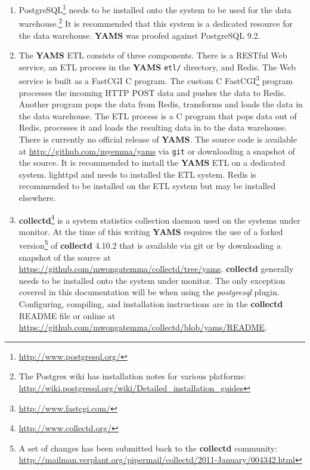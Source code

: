 \documentclass[a4paper,twoside,12pt]{article}
\begin{document}
\begin{enumerate}
  \item PostgreSQL\footnote{\url{http://www.postgresql.org/}} needs to be
        installed onto the system to be used for the data
        warehouse.\footnote{The Postgres wiki has installation notes for
        various platforms:
        \url{http://wiki.postgresql.org/wiki/Detailed_installation_guides}} It
        is recommended that this system is a dedicated resource for the data
        warehouse.  \textbf{YAMS} was proofed against PostgreSQL 9.2.
  \item The \textbf{YAMS} ETL consists of three components.  There is a RESTful
        Web service, an ETL process in the \textbf{YAMS} \texttt{etl/}
        directory, and Redis.  The Web service is built as a FastCGI C program.
        The custom C FastCGI\footnote{\url{http://www.fastcgi.com/}} program
        processes the incoming HTTP POST data and pushes the data to Redis.
        Another program pops the data from Redis, transforms and loads the data
        in the data warehouse.  The ETL process is a C program that pops data
        out of Redis, processes it and loads the resulting data in to the data
        warehouse.  There is currently no official release of \textbf{YAMS}.
        The source code is available at \url{http://github.com/myemma/yams} via
        \texttt{git} or downloading a snapshot of the source.  It is
        recommended to install the \textbf{YAMS} ETL on a dedicated system.
        lighttpd and needs to installed the ETL system.  Redis is recommended
        to be installed on the ETL system but may be installed elsewhere.
  \item \textbf{collectd}\footnote{\url{http://www.collectd.org/}} is a system
        statistics collection daemon used on the systems under monitor.  At the
        time of this writing \textbf{YAMS} requires the use of a forked
        version\footnote{A set of changes has been submitted back to the
        \textbf{collectd} community:
        \url{http://mailman.verplant.org/pipermail/collectd/2011-January/004342.html}}
        of \textbf{collectd} 4.10.2 that is available via git or by downloading
        a snapshot of the source at
        \url{https://github.com/mwongatemma/collectd/tree/yams}.
        \textbf{collectd} generally needs to be installed onto the system under
        monitor.  The only exception covered in this documentation will be when
        using the \textit{postgresql} plugin.  Configuring, compiling, and
        installation instructions are in the \textbf{collectd} README file or
        online at
        \url{https://github.com/mwongatemma/collectd/blob/yams/README}.

\end{enumerate}
\end{document}
